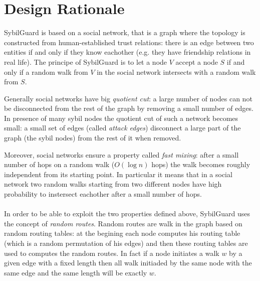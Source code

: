 \documentclass[a4paper,11pt]{article}
\begin{document}

\section{Design Rationale}


SybilGuard is based on a social network, that is a graph where the topology is constructed from human-established trust relations: there is an edge between two entities if and only if they know eachother (e.g. they have friendship relations in real life).
The principe of SybilGuard is to let a node $V$ accept a node $S$ if and only if a random walk from $V$ in the social network intersects with a random walk from $S$.

Generally social networks have  big \emph{quotient cut}: a large number of nodes can not be disconnected from the rest of the graph by removing a small number of edges.
In presence of many sybil nodes the quotient cut of such a network becomes small: a small set of edges (called \emph{attack edges}) disconnect a large part of the graph (the sybil nodes) from the rest of it when removed.

Moreover, social networks ensure a property called \emph{fast mixing}: after a small number of hops on a random walk ($O(\log n)$ hops) the walk becomes roughly independent from its starting point.
In particular it means that in a social network two random walks starting from two different nodes have high probability to instersect eachother after a small number of hops.


\paragraph{}
In order to be able to exploit the two properties defined above, SybilGuard uses the concept of \emph{random routes}.
Random routes are walk in the graph based on random routing tables: at the begining each node computes his routing table (which is a random permutation of his edges) and then these routing tables are used to computes the random routes.
In fact if a node initiates a walk $w$ by a given edge with a fixed length then all walk initiaded by the same node with the same edge and the same length will be exactly $w$.
\end{document}
